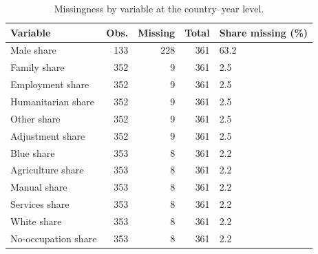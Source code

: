 \begin{table}

\caption{Missingness by variable at the country–year level.}
\centering
\begin{tabular}[t]{lrrrl}
\toprule
Variable & Obs. & Missing & Total & Share missing (\%)\\
\midrule
Male share & 133 & 228 & 361 & 63.2\\
Family share & 352 & 9 & 361 & 2.5\\
Employment share & 352 & 9 & 361 & 2.5\\
Humanitarian share & 352 & 9 & 361 & 2.5\\
Other share & 352 & 9 & 361 & 2.5\\
\addlinespace
Adjustment share & 352 & 9 & 361 & 2.5\\
Blue share & 353 & 8 & 361 & 2.2\\
Agriculture share & 353 & 8 & 361 & 2.2\\
Manual share & 353 & 8 & 361 & 2.2\\
Services share & 353 & 8 & 361 & 2.2\\
\addlinespace
White share & 353 & 8 & 361 & 2.2\\
No-occupation share & 353 & 8 & 361 & 2.2\\
\bottomrule
\end{tabular}
\end{table}
